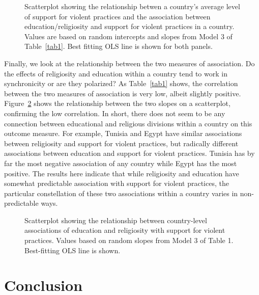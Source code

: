\documentclass[10pt,letterpaper]{article}
\begin{document}
\begin{figure}[!h]
\centering
\caption{Scatterplot showing the relationship betwen a country's average
level of support for violent practices and the association between
education/religiosity and support for violent practices in a country.
Values are based on random intercepts and slopes from Model 3 of Table~\ref{tab1}. Best fitting OLS line is shown for both panels.}
\label{fig4}
\end{figure}

Finally, we look at the relationship between the two measures of
association. Do the effects of religiosity and education within a
country tend to work in synchronicity or are they polarized? As Table~\ref{tab1}
shows, the correlation between the two measures of association is very
low, albeit slightly positive. Figure~\ref{fig5} shows the relationship between
the two slopes on a scatterplot, confirming the low correlation. In
short, there does not seem to be any connection between educational and
religious divisions within a country on this outcome measure. For
example, Tunisia and Egypt have similar associations between religiosity
and support for violent practices, but radically different associations
between education and support for violent practices. Tunisia has by far
the most negative association of any country while Egypt has the most
positive. The results here indicate that while religiosity and education
have somewhat predictable association with support for violent
practices, the particular constellation of these two associations within
a country varies in non-predictable ways.

\begin{figure}[!h]
\centering
\caption{Scatterplot showing the relationship between country-level
associations of education and religiosity with support for violent
practices. Values based on random slopes from Model 3 of Table 1.
Best-fitting OLS line is shown.}
\label{fig5}
\end{figure}

\section*{Conclusion}
\end{document}
